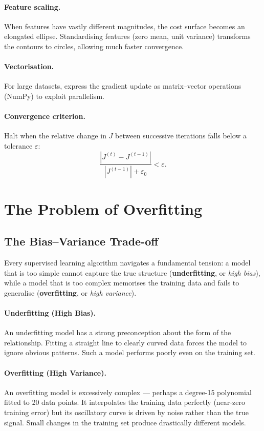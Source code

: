 \paragraph{Feature scaling.}
When features have vastly different magnitudes, the cost surface becomes an
elongated ellipse. Standardising features (zero mean, unit variance) transforms
the contours to circles, allowing much faster convergence.

\paragraph{Vectorisation.}
For large datasets, express the gradient update as matrix--vector operations
(NumPy) to exploit parallelism.

\paragraph{Convergence criterion.}
Halt when the relative change in $J$ between successive iterations falls below
a tolerance $\varepsilon$:
\[\frac{|J^{(t)}-J^{(t-1)}|}{|J^{(t-1)}|+\varepsilon_0}<\varepsilon.\]

\section{The Problem of Overfitting}
\label{sec:overfit}

\subsection{The Bias--Variance Trade-off}

Every supervised learning algorithm navigates a fundamental tension: a model
that is too simple cannot capture the true structure (\textbf{underfitting},
or \emph{high bias}), while a model that is too complex memorises the training
data and fails to generalise (\textbf{overfitting}, or \emph{high variance}).

\paragraph{Underfitting (High Bias).}
An underfitting model has a strong preconception about the form of the
relationship. Fitting a straight line to clearly curved data forces the model
to ignore obvious patterns. Such a model performs poorly even on the training
set.

\paragraph{Overfitting (High Variance).}
An overfitting model is excessively complex — perhaps a degree-15 polynomial
fitted to 20 data points. It interpolates the training data perfectly (near-zero
training error) but its oscillatory curve is driven by noise rather than the
true signal. Small changes in the training set produce drastically different
models.

